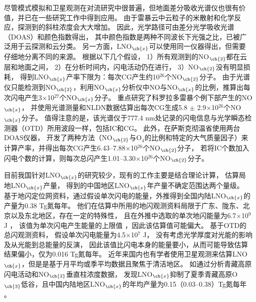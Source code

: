 尽管模式模拟和卫星观测在对流研究中很普遍，但地面差分吸收光谱仪也很有价值，并已在一些研究工作中得到应用。
由于雷暴云中云粒子的米散射和化学反应，探测到的斜柱浓度会大大增加\citep{Erle.1995,Pfeilsticker.1998,Winterrath.1999}。
因此，光学路径可由差分光学吸收光谱（DOAS）和颜色指数得出\citep{Veitel.1998,Wagner.1998}，
其中颜色指数是两种不同波长下光强之比，已被广泛用于云探测和云分类\citep{Wagner.2014,Wang.2015,Wagner.2016}。
另一方面，LNO$_{\ch{x}}$可以使用同一仪器得出，但需要仔细地分离不同的来源。
\citet{Noxon.1976}根据以下几个假设，
1）所有观测到的NO$_{\ch{2}}$都在云层和地面之间，
2）在分析时间内，闪电活动仍在进行，
3）NO$_{\ch{2}}$没有明显损耗，
得到LNO$_{\ch{x}}$产率下限为：每次CG产生约10$^{26}$个NO$_{\ch{2}}$分子。
由于光谱仪只能检测到NO$_{\ch{2}}$，\citet{Franzblau.1989}利用NO$_{\ch{x}}$分析仪中NO与NO$_{\ch{x}}$的比例，推算出每次闪电产生3$\times$10$^{27}$个NO$_{\ch{x}}$分子。
\citet{Langford.2004}重点研究了科罗拉多雷暴个例下部产生的NO$_{\ch{x}}$，
并使用光谱测量和NLDN数据估算出每次CG生成5.8 $\pm$ 2.9$\times$10$^{26}$个NO$_{\ch{x}}$分子。
值得注意的是，该光谱仪于777.4 nm处记录的闪电信息与光学瞬态检测器（OTD）所用波段一样，包括IC和CG。
此外，\citet{Fraser.2007}在萨斯克彻温省使用两台DOAS仪器，
开发了两种方法（NO$_{\ch{2}}$与O$_4$的比例和特定的大气质量因子）来计算产率，并得出每次CG产生6.43--7.88$\times$10$^{26}$个NO$_{\ch{2}}$分子，
若将IC个数加入闪电个数的计算，则每次总闪产生1.01--3.30$\times$10$^{26}$个NO$_{\ch{2}}$分子。

目前我国针对LNO$_{\ch{x}}$的研究较少，现有的工作主要是结合理论计算，
估算局地LNO$_{\ch{x}}$产量\citep{DuJian.2002,ZhangYiJun.2002,ZhouYunJun.2002}，
得到的中国地区LNO$_{\ch{x}}$年产量不确定范围达两个量级。
\citet{ZhouYunJun.2004}基于地闪定位网资料，通过假设单次闪电的能量，外推得到全国内陆LNO$_{\ch{x}}$的产量为0.38 Tg氮每年。
他们在估算中所用的地闪观测资料局限于广东、陇东、北京以及东北地区，存在一定的特殊性，
且在外推中选取的单次地闪能量为6.7$\times$10$^9$ J \citep{Price.1997a,Price.1997b}，
该值为单次闪电产生能量的上限值 \citep{Wang.1998}，因此该估算值可能偏大。
\citet{SunAnPing.2004}基于OTD的总闪观测资料，
假设单次闪电能量为4.5$\times$10$^7$ J，
没有考虑光学厚度对光能的影响及从光能到总能量的反演，
因此该值比闪电本身的能量要小，从而可能导致估算结果偏小，仅为0.016 Tg氮每年。
近年来国内也有学者使用卫星观测来估算LNO$_{\ch{x}}$，但是是基于月平均或季平均数据且聚焦于清洁地区。
如通过分析青藏高原闪电活动和NO$_{\ch{2}}$垂直柱浓度数据，
发现LNO$_{\ch{x}}$抑制了夏季青藏高原O$_{\ch{3}}$低谷，且中国内陆地区LNO$_{\ch{x}}$的年均产量为0.15（0.03--0.38）Tg氮每年 \citep{JuXiaoYu.2015,Guo.2017,GuoFengXia.2019,Li.2022}。


